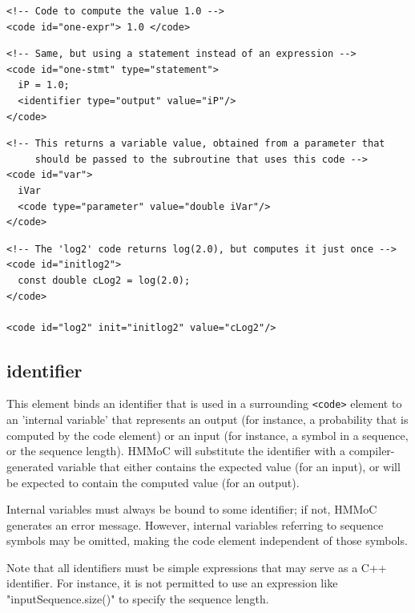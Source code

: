 \documentclass{article}
\begin{document}
\Example

\begin{verbatim}
<!-- Code to compute the value 1.0 -->
<code id="one-expr"> 1.0 </code>
\end{verbatim}



\begin{verbatim}
<!-- Same, but using a statement instead of an expression -->
<code id="one-stmt" type="statement"> 
  iP = 1.0;
  <identifier type="output" value="iP"/>
</code>
\end{verbatim}

\begin{verbatim}
<!-- This returns a variable value, obtained from a parameter that
     should be passed to the subroutine that uses this code -->
<code id="var"> 
  iVar
  <code type="parameter" value="double iVar"/>
</code>
\end{verbatim}

\begin{verbatim}
<!-- The 'log2' code returns log(2.0), but computes it just once -->
<code id="initlog2">
  const double cLog2 = log(2.0);
</code>

<code id="log2" init="initlog2" value="cLog2"/>
\end{verbatim}



\subsection{identifier}


This element binds an identifier that is used in a surrounding {\tt <code>} element to 
an 'internal variable' that represents an output (for instance, a probability that is 
computed by the code element) or an input (for instance, a symbol in a sequence, or
the sequence length).  HMMoC will substitute the identifier with a compiler-generated
variable that either contains the expected value (for an input), or will be expected 
to contain the computed value (for an output).

Internal variables must always be bound to some identifier; if not, HMMoC generates 
an error message.  However, internal variables referring to sequence symbols 
may be omitted, making the code element independent of those symbols.

Note that all identifiers must be simple expressions that may serve as a C++ identifier.
For instance, it is not permitted to use an expression like "inputSequence.size()"
to specify the sequence length.
\end{document}
